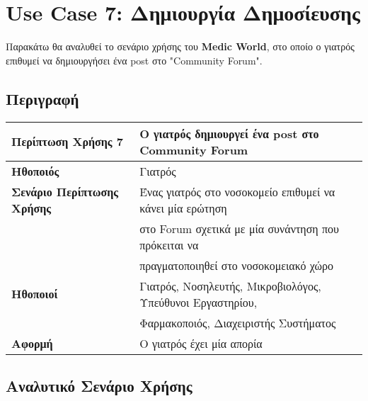 \documentclass{article}
\newcommand\T{\rule{0pt}{2.6ex}}       %
\newcommand\B{\rule[-1.2ex]{0pt}{0pt}}
\begin{document}
\section{Use Case 7: Δημιουργία Δημοσίευσης}

Παρακάτω θα αναλυθεί το σενάριο χρήσης του \textbf{Medic World}, στο οποίο ο γιατρός επιθυμεί να δημιουργήσει ένα post στο "Community Forum".

\subsection{Περιγραφή}

\begin{center}
     \begin{tabular}{|l|l|}
     \hline
      \textbf{Περίπτωση Χρήσης 7} & Ο γιατρός δημιουργεί ένα post στο Community Forum \T\B \\ 
      \hline
      \textbf{Ηθοποιός} & Γιατρός \T\B \\
      \hline
      \textbf{Σενάριο Περίπτωσης Χρήσης} & Ένας γιατρός στο νοσοκομείο επιθυμεί να κάνει μία ερώτηση \T \\& στο Forum σχετικά με μία συνάντηση που πρόκειται να \\& πραγματοποιηθεί στο νοσοκομειακό χώρο \B \\
      \hline
      \textbf{Ηθοποιοί} & Γιατρός, Νοσηλευτής, Μικροβιολόγος, Υπεύθυνοι Εργαστηρίου, \T \\& Φαρμακοποιός, Διαχειριστής Συστήματος \B \\
      \hline
      \textbf{Αφορμή} &  Ο γιατρός έχει μία απορία\T\B \\
      \hline
     \end{tabular}
 \end{center}

 
\subsection{Αναλυτικό Σενάριο Χρήσης}
\end{document}
